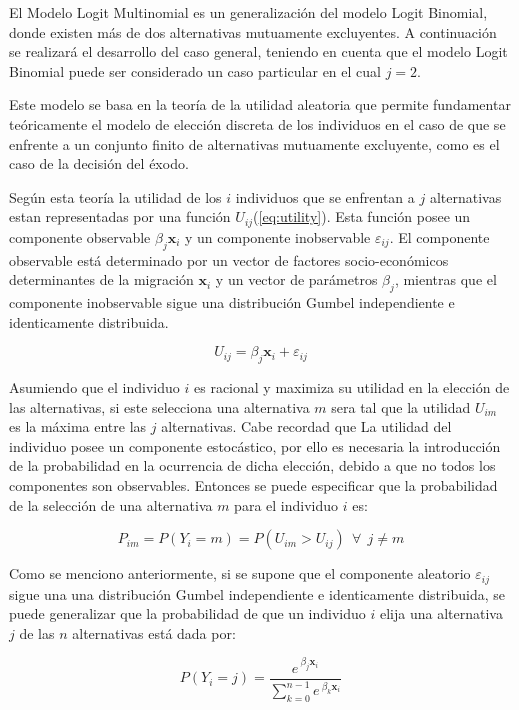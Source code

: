 \documentclass[12pt,a4paper]{article}
\begin{document}
El Modelo Logit Multinomial es un generalización del modelo Logit Binomial, donde existen más de dos alternativas mutuamente excluyentes. A continuación se realizará el desarrollo del caso general, teniendo en cuenta que el modelo Logit Binomial puede ser considerado un caso particular en el cual $j=2$.

Este modelo se basa en la teoría de la utilidad aleatoria \parencite{domencich_urban_1975} que permite fundamentar teóricamente el modelo de elección discreta de los individuos en el caso de que se enfrente a un conjunto finito de alternativas mutuamente excluyente, como es el caso de la decisión del éxodo.

Según esta teoría la utilidad de los $i$ individuos que se enfrentan a $j$ alternativas estan representadas por una función $U_{ij}$(\ref{eq:utility}). Esta función posee un componente observable $\beta_{j} \textbf{x}_{i}$ y un componente inobservable $\varepsilon_{ij}$. El componente observable está determinado por un vector de factores socio-económicos determinantes de la migración $\textbf{x}_{i}$ y un vector de parámetros $\beta_{j}$, mientras que el componente inobservable sigue una distribución  Gumbel independiente e identicamente distribuida.
\begin {center}
\begin{equation}\label{eq:utility}
U_{ij}=\beta_{j} \textbf{x}_{i}+\varepsilon_{ij}
\end{equation}
\end {center}

Asumiendo que el individuo $i$ es racional y maximiza su utilidad en la elección de las  alternativas, si este selecciona una alternativa $m$ sera tal que la utilidad $U_{im}$ es la máxima entre las $j$ alternativas. Cabe recordad que La utilidad del individuo posee un componente estocástico, por ello es necesaria la introducción de la probabilidad en la ocurrencia de dicha elección, debido a que no todos los componentes son observables. Entonces se puede especificar que  la probabilidad de la selección de una alternativa $m$ para el individuo $i$ es:
\begin {center}
\begin{equation}\label{eq:prob}
P_{im}=P{(Y_{i}=m)} =P(U_{im}>U_{ij}) \ \ \forall \ \ j\neq m
\end{equation}
\end {center}

Como se menciono anteriormente, si se supone que el componente aleatorio $\varepsilon_{ij}$ sigue una una distribución Gumbel independiente e identicamente distribuida, se puede generalizar que la probabilidad de que un individuo $i$ elija una alternativa $j$ de las $n$ alternativas está dada por:
\begin {center}
\begin{equation}\label{eq:multinom}
P{(Y_{i}=j)}=\frac{e^{\ \beta_{j} \textbf{x}_{i}}}{\sum_{k=0}^{n-1}e^{\ \beta_{k} \textbf{x}_{i}}}
\end{equation}
\end {center}
\end{document}
